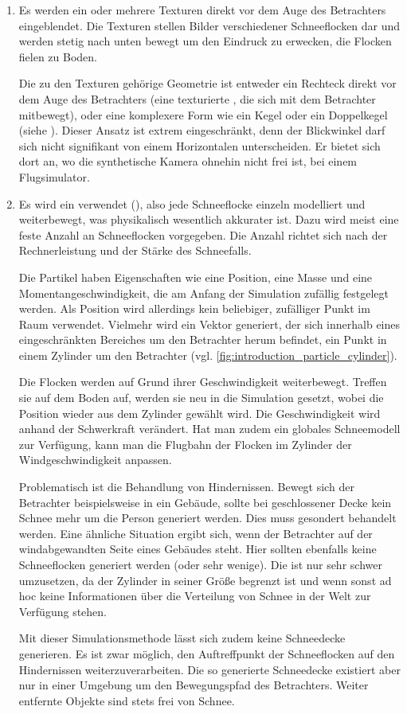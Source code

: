 \begin{enumerate}
\item Es werden ein oder mehrere Texturen direkt vor dem Auge des
Betrachters eingeblendet. Die Texturen stellen Bilder verschiedener
Schneeflocken dar und werden stetig nach unten bewegt um den Eindruck
zu erwecken, die Flocken fielen zu Boden.

Die zu den Texturen gehörige Geometrie ist entweder ein Rechteck
direkt vor dem Auge des Betrachters (eine texturierte
, die sich mit dem Betrachter mitbewegt),
oder eine komplexere Form wie ein Kegel oder ein Doppelkegel (siehe
\cite{Wang2004}). Dieser Ansatz ist extrem eingeschränkt, denn der
Blickwinkel darf sich nicht signifikant von einem Horizontalen
unterscheiden. Er bietet sich dort an, wo die synthetische Kamera
ohnehin nicht frei ist, \PimiddyzB{} bei einem Flugsimulator.
\item Es wird ein 
verwendet (\cite{Reeves:1983:PST:357318.357320}), also jede Schneeflocke
einzeln modelliert und weiterbewegt, was physikalisch wesentlich
akkurater ist. Dazu wird meist eine feste Anzahl an Schneeflocken
vorgegeben. Die Anzahl richtet sich nach der Rechnerleistung und der
Stärke des Schneefalls.

Die Partikel haben Eigenschaften wie eine Position, eine Masse und
eine Momentangeschwindigkeit, die am Anfang der Simulation zufällig
festgelegt werden. Als Position wird allerdings kein beliebiger,
zufälliger Punkt im Raum verwendet. Vielmehr wird ein Vektor
generiert, der sich innerhalb eines eingeschränkten Bereiches um den
Betrachter herum befindet, \PimiddyzB{} ein Punkt in einem Zylinder um
den Betrachter (vgl. \cref{fig:introduction_particle_cylinder}).

Die Flocken werden auf Grund ihrer Geschwindigkeit
weiterbewegt. Treffen sie auf dem Boden auf, werden sie neu in die
Simulation gesetzt, wobei die Position wieder aus dem Zylinder gewählt
wird. Die Geschwindigkeit wird anhand der Schwerkraft verändert.  Hat
man zudem ein globales Schneemodell zur Verfügung, kann man die
Flugbahn der Flocken im Zylinder der Windgeschwindigkeit anpassen.

Problematisch ist die Behandlung von Hindernissen. Bewegt sich der
Betrachter beispielsweise in ein Gebäude, sollte bei geschlossener
Decke kein Schnee mehr um die Person generiert werden. Dies muss
gesondert behandelt werden. Eine ähnliche Situation ergibt sich, wenn
der Betrachter auf der windabgewandten Seite eines Gebäudes
steht. Hier sollten ebenfalls keine Schneeflocken generiert werden
(oder sehr wenige). Die ist nur sehr schwer umzusetzen, da der
Zylinder in seiner Größe begrenzt ist und wenn sonst ad hoc keine
Informationen über die Verteilung von Schnee in der Welt zur Verfügung
stehen.

Mit dieser Simulationsmethode lässt sich zudem keine Schneedecke
generieren. Es ist zwar möglich, den Auftreffpunkt der Schneeflocken
auf den Hindernissen weiterzuverarbeiten. Die so generierte
Schneedecke existiert aber nur in einer Umgebung um den Bewegungspfad
des Betrachters. Weiter entfernte Objekte sind stets frei von
Schnee.
\end{enumerate}

